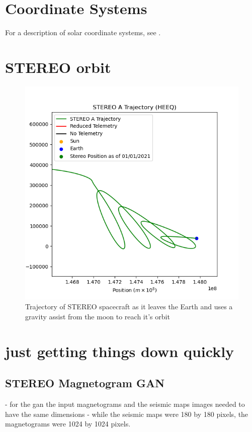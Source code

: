\documentclass[11pt,a4paper,onecolumn]{report}
\begin{document}





\appendix

\chapter{Coordinate Systems}
For a description of solar coordinate systems, see
\citet{thompson_w_t_coordinate_2006}.

\chapter{STEREO orbit}
\label{app:fun orbit}
\begin{figure}[ht]
  \centering
  \includegraphics[width=0.8\linewidth]{fun_orbit.png}
  \caption{Trajectory of STEREO spacecraft as it leaves the Earth and uses a gravity assist from the moon to reach it's orbit}
  \label{fig:fun_orbit}
\end{figure}

\chapter{just getting things down quickly}



\section{STEREO Magnetogram GAN}
- for the gan the input magnetograms and the seismic maps images needed to have
the same dimensions - while the seismic maps were 180 by 180 pixels, the
magnetograms were 1024 by 1024 pixels.
\end{document}
